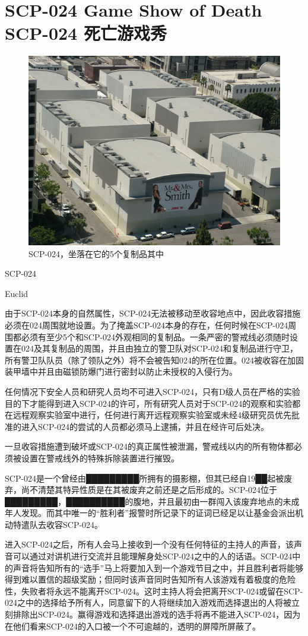 \chapter[SCP-024 死亡游戏秀]{
    SCP-024 Game Show of Death\\
    SCP-024 死亡游戏秀
}

\label{chap:SCP-024}

\begin{figure}[H]
    \centering
    \includegraphics[width=0.5\linewidth]{images/SCP-024.jpg}
    \caption*{SCP-024，坐落在它的5个复制品其中}
\end{figure}

SCP-024

Euclid

由于SCP-024本身的自然属性，SCP-024无法被移动至收容地点中，因此收容措施必须在024周围就地设置。为了掩盖SCP-024本身的存在，任何时候在SCP-024周围都必须有至少5个和SCP-024外观相同的复制品。一条严密的警戒线必须随时设置在024及其复制品的周围，并且由独立的警卫队对SCP-024和复制品进行守卫，所有警卫队队员（除了领队之外）将不会被告知024的所在位置。024被收容在加固装甲墙中并且由磁锁防爆门进行密封以防止未授权的入侵行为。

任何情况下安全人员和研究人员均不可进入SCP-024，只有D级人员在严格的实验目的下才能得到进入SCP-024的许可，所有研究人员对于SCP-024的观察和实验都在远程观察实验室中进行，任何进行离开远程观察实验室或未经4级研究员优先批准的进入SCP-024的尝试的人员都必须马上逮捕，并且在经许可后处决。

一旦收容措施遭到破坏或SCP-024的真正属性被泄漏，警戒线以内的所有物体都必须被设置在警戒线外的特殊拆除装置进行摧毁。

SCP-024是一个曾经由█████████所拥有的摄影棚，但其已经自19██起被废弃，尚不清楚其特异性质是在其被废弃之前还是之后形成的。SCP-024位于█████████，██████████的腹地，并且最初由一群闯入该废弃地点的未成年人发现。而其中唯一的“胜利者”报警时所记录下的证词已经足以让基金会派出机动特遣队去收容SCP-024。

进入SCP-024之后，所有人会马上接收到一个没有任何特征的主持人的声音，该声音可以通过对讲机进行交流并且能理解身处SCP-024之中的人的话语。SCP-024中的声音将告知所有的“选手”马上将要加入到一个游戏节目之中，并且胜利者将能够得到难以置信的超级奖励；但同时该声音同时告知所有人该游戏有着极度的危险性，失败者将永远不能离开SCP-024。这时主持人将会把离开SCP-024或留在SCP-024之中的选择给予所有人，同意留下的人将继续加入游戏而选择退出的人将被立刻排除出SCP-024。赢得游戏和选择退出游戏的选手将再不能进入SCP-024，因为在他们看来SCP-024的入口被一个不可逾越的，透明的屏障所屏蔽了。

